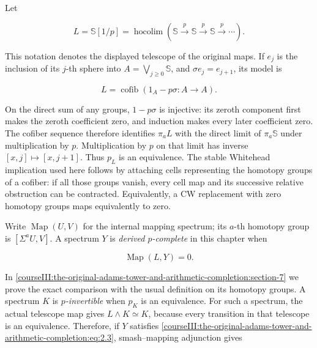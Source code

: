\label{courseIII:the-original-adams-tower-and-arithmetic-completion:section-2}\label{courseIII:adams-arithmetic:2}

Let

\begin{equation}
L=\mathbb S[1/p]
=\operatorname*{hocolim}(\mathbb S\xrightarrow p\mathbb S\xrightarrow p\mathbb S\xrightarrow p\cdots).
\label{courseIII:the-original-adams-tower-and-arithmetic-completion:eq:2.1}
\end{equation}

This notation denotes the displayed telescope of the original maps. If \(e_j\) is the inclusion of its \(j\)-th sphere into \(A=\bigvee_{j\geq0}\mathbb S\), and \(\sigma e_j=e_{j+1}\), its model is

\begin{equation}
L=\operatorname{cofib}(1_A-p\sigma:A\longrightarrow A).
\label{courseIII:the-original-adams-tower-and-arithmetic-completion:eq:2.2}
\end{equation}

On the direct sum of any groups, \(1-p\sigma\) is injective: its zeroth component first makes the zeroth coefficient zero, and induction makes every later coefficient zero. The cofiber sequence therefore identifies \(\pi_aL\) with the direct limit of \(\pi_a\mathbb S\) under multiplication by \(p\). Multiplication by \(p\) on that limit has inverse \([x,j]\mapsto[x,j+1]\). Thus \(p_L\) is an equivalence. The stable Whitehead implication used here follows by attaching cells representing the homotopy groups of a cofiber: if all those groups vanish, every cell map and its successive relative obstruction can be contracted. Equivalently, a CW replacement with zero homotopy groups maps equivalently to zero.

Write \(\operatorname{Map}(U,V)\) for the internal mapping spectrum; its \(a\)-th homotopy group is \([\Sigma^aU,V]\). A spectrum \(Y\) is \emph{derived \(p\)-complete} in this chapter when

\begin{equation}
\operatorname{Map}(L,Y)=0.
\label{courseIII:the-original-adams-tower-and-arithmetic-completion:eq:2.3}
\end{equation}

In \cref{courseIII:the-original-adams-tower-and-arithmetic-completion:section-7} we prove the exact comparison with the usual definition on its homotopy groups. A spectrum \(K\) is \emph{\(p\)-invertible} when \(p_K\) is an equivalence. For such a spectrum, the actual telescope map gives \(L\wedge K\simeq K\), because every transition in that telescope is an equivalence. Therefore, if \(Y\) satisfies \eqref{courseIII:the-original-adams-tower-and-arithmetic-completion:eq:2.3}, smash--mapping adjunction gives

